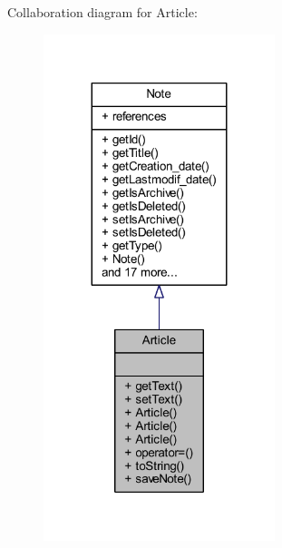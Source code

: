 Collaboration diagram for Article\+:\nopagebreak
\begin{figure}[H]
\begin{center}
\leavevmode
\includegraphics[width=191pt]{class_article__coll__graph}
\end{center}
\end{figure}
